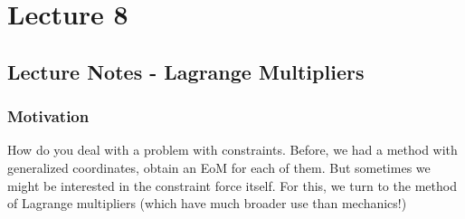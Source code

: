 \section{Lecture 8}
\subsection{Lecture Notes - Lagrange Multipliers}
\subsubsection{Motivation}
How do you deal with a problem with constraints. Before, we had a method with generalized coordinates, obtain an EoM for each of them. But sometimes we might be interested in the constraint force itself. For this, we turn to the method of Lagrange multipliers (which have much broader use than mechanics!)